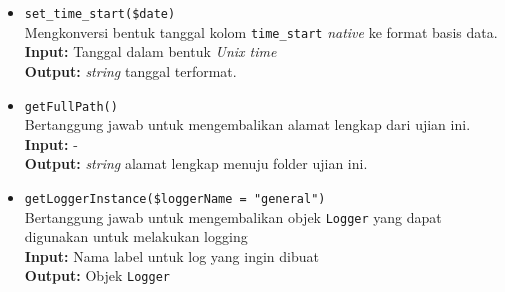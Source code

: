 \begin{itemize}
\begin{itemize}
                \item \texttt{set\_time\_start(\$date)} \\
                    Mengkonversi bentuk tanggal kolom \texttt{time\_start}
                    \textit{native} ke format basis data. \\
                    \textbf{Input:} Tanggal dalam bentuk \textit{Unix time}\\
                    \textbf{Output:} \textit{string} tanggal terformat.
                
                \item \texttt{getFullPath()} \\
                    Bertanggung jawab untuk mengembalikan alamat lengkap dari
                    ujian ini. \\
                    \textbf{Input:} -\\
                    \textbf{Output:} \textit{string} alamat lengkap menuju
                    folder ujian ini.
                
                \item \texttt{getLoggerInstance(\$loggerName = "general")} \\
                    Bertanggung jawab untuk mengembalikan objek \texttt{Logger}
                    yang dapat digunakan untuk melakukan logging\\
                    \textbf{Input:} Nama label untuk log yang ingin dibuat\\
                    \textbf{Output:} Objek \texttt{Logger}
            \end{itemize}
            

\end{itemize}
